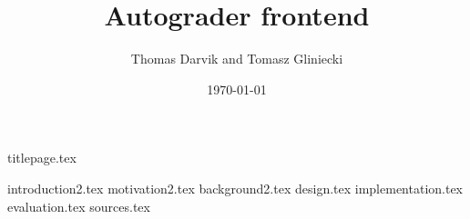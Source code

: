 \documentclass[12pt]{report}
\title{Autograder frontend}
\author{Thomas Darvik and Tomasz Gliniecki}
\date{\today}
\begin{document}
{titlepage.tex}
{}
\tableofcontents
{}

{introduction2.tex}
{motivation2.tex}
{background2.tex}
{design.tex}
{implementation.tex}
{evaluation.tex}
{sources.tex}
\end{document}
